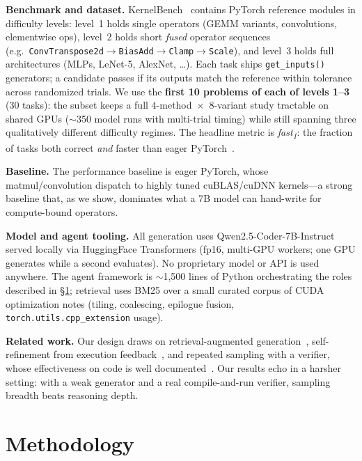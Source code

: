 \documentclass[conference]{IEEEtran}
\begin{document}
\textbf{Benchmark and dataset.} KernelBench~\cite{kernelbench} contains PyTorch
reference modules in difficulty levels: level~1 holds single operators (GEMM
variants, convolutions, elementwise ops), level~2 holds short \emph{fused} operator
sequences (e.g.\ \texttt{ConvTranspose2d}$\to$\allowbreak\texttt{BiasAdd}$\to$\allowbreak\texttt{Clamp}$\to$\allowbreak\texttt{Scale}), and
level~3 holds full architectures (MLPs, LeNet-5, AlexNet, \dots). Each task ships
\texttt{get\_inputs()} generators; a candidate passes if its outputs match the
reference within tolerance across randomized trials. We use the \textbf{first 10
problems of each of levels 1--3} (30 tasks): the subset keeps a full
$4$-method~$\times$~$8$-variant study tractable on shared GPUs ($\sim$350 model
runs with multi-trial timing) while still spanning three qualitatively different
difficulty regimes. The headline metric is \emph{fast\textsubscript{1}}: the
fraction of tasks both correct \emph{and} faster than eager PyTorch~\cite{kernelbench}.

\textbf{Baseline.} The performance baseline is eager PyTorch, whose
matmul/convolution dispatch to highly tuned cuBLAS/cuDNN kernels---a strong
baseline that, as we show, dominates what a 7B model can hand-write for
compute-bound operators.

\textbf{Model and agent tooling.} All generation uses
Qwen2.5-Coder-7B-Instruct~\cite{qwen25coder} served locally via HuggingFace
Transformers (fp16, multi-GPU workers; one GPU generates while a second evaluates).
No proprietary model or API is used anywhere. The agent framework is $\sim$1{,}500
lines of Python orchestrating the roles described in \S\ref{sec:method};
retrieval uses BM25 over a small curated corpus of CUDA optimization notes
(tiling, coalescing, epilogue fusion, \texttt{torch.utils.cpp\_extension} usage).

\textbf{Related work.} Our design draws on retrieval-augmented
generation~\cite{rag}, self-refinement from execution
feedback~\cite{selfrefine,selfdebug,reflexion}, and repeated sampling with a
verifier, whose effectiveness on code is well documented~\cite{alphacode,monkeys}.
Our results echo \cite{monkeys} in a harsher setting: with a weak generator and a
real compile-and-run verifier, sampling breadth beats reasoning depth.

\section{Methodology}\label{sec:method}
\end{document}
